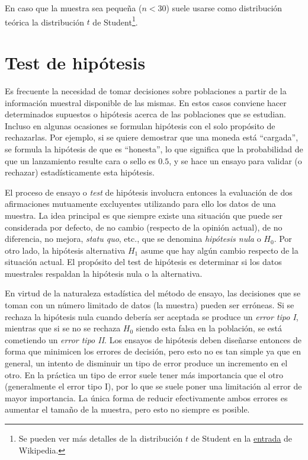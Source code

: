
En caso que la muestra sea pequeña ($n < 30$) suele usarse como distribución teórica la distribución $t$ de Student\footnote{Se pueden ver más detalles de la distribución $t$ de Student en la \href{https://es.wikipedia.org/wiki/Distribución_t_de_Student}{entrada} de Wikipedia.}.

\section{Test de hipótesis}

Es frecuente la necesidad de tomar decisiones sobre poblaciones a partir de la información muestral disponible de las mismas. En estos casos conviene hacer determinados supuestos o hipótesis acerca de las poblaciones que se estudian. Incluso en algunas ocasiones se formulan hipótesis con el solo propósito de rechazarlas. Por ejemplo, si se quiere demostrar que una moneda está ``cargada'', se formula la hipótesis de que es ``honesta'', lo que significa que la probabilidad de que un lanzamiento resulte cara o sello es $0.5$, y se hace un ensayo para validar (o rechazar) estadísticamente esta hipótesis.

El proceso de ensayo o \textit{test} de hipótesis involucra entonces la evaluación de dos afirmaciones mutuamente excluyentes utilizando para ello los datos de una muestra. La idea principal es que siempre existe una situación que puede ser considerada por defecto, de no cambio (respecto de la opinión actual), de no diferencia, no mejora, \textit{statu quo}, etc., que se denomina \textit{hipótesis nula} o $H_0$. Por otro lado, la hipótesis alternativa $H_1$ asume que hay algún cambio respecto de la situación actual. El propósito del test de hipótesis es determinar si los datos muestrales respaldan la hipótesis nula o la alternativa.

En virtud de la naturaleza estadística del método de ensayo, las decisiones que se toman con un número limitado de datos (la muestra) pueden ser erróneas. Si se rechaza la hipótesis nula cuando debería ser aceptada se produce un \textit{error tipo I}, mientras que si se no se rechaza $H_0$ siendo esta falsa en la población, se está cometiendo un \textit{error tipo II}. Los ensayos de hipótesis deben diseñarse entonces de forma que minimicen los errores de decisión, pero esto no es tan simple ya que en general, un intento de disminuir un tipo de error produce un incremento en el otro. En la práctica un tipo de error suele tener más importancia que el otro (generalmente el error tipo I), por lo que se suele poner una limitación al error de mayor importancia. La única forma de reducir efectivamente ambos errores es aumentar el tamaño de la muestra, pero esto no siempre es posible.


